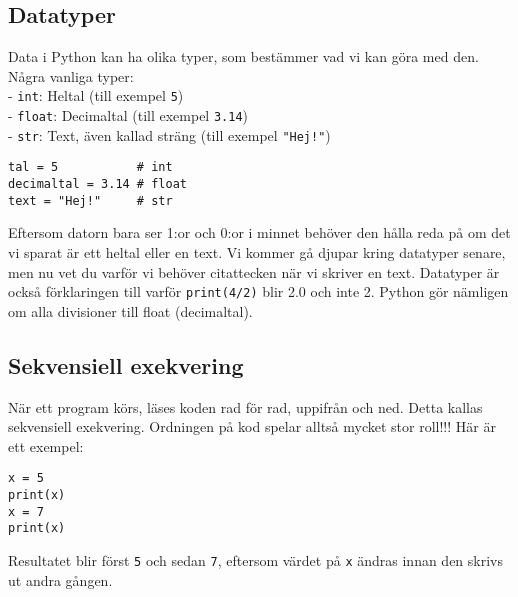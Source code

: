 \subsection{Datatyper}
Data i Python kan ha olika typer, som bestämmer vad vi kan göra med den. 
Några vanliga typer:\\
- \texttt{int}: Heltal (till exempel \texttt{5})\\
- \texttt{float}: Decimaltal (till exempel \texttt{3.14})\\
- \texttt{str}: Text, även kallad sträng (till exempel \texttt{"Hej!"})\\

\begin{lstlisting}[title=Exempel på olika datatyper]
tal = 5           # int
decimaltal = 3.14 # float
text = "Hej!"     # str
\end{lstlisting}

Eftersom datorn bara ser 1:or och 0:or i minnet behöver den hålla reda på om det vi sparat
är ett heltal eller en text. Vi kommer gå djupar kring datatyper senare, men nu vet du varför vi behöver citattecken när vi 
skriver en text. 
Datatyper är också förklaringen till varför \texttt{print(4/2)} blir 2.0 och inte 2. 
Python gör nämligen om alla divisioner till float (decimaltal).



\subsection{Sekvensiell exekvering}
När ett program körs, läses koden rad för rad, uppifrån och ned. 
Detta kallas sekvensiell exekvering. 
Ordningen på kod spelar alltså mycket stor roll!!!
Här är ett exempel:

\begin{lstlisting}[title=Ordning i koden spelar roll]
x = 5
print(x)
x = 7
print(x)
\end{lstlisting}

Resultatet blir först \texttt{5} och sedan \texttt{7}, eftersom värdet på \texttt{x} ändras innan den skrivs ut andra gången.


